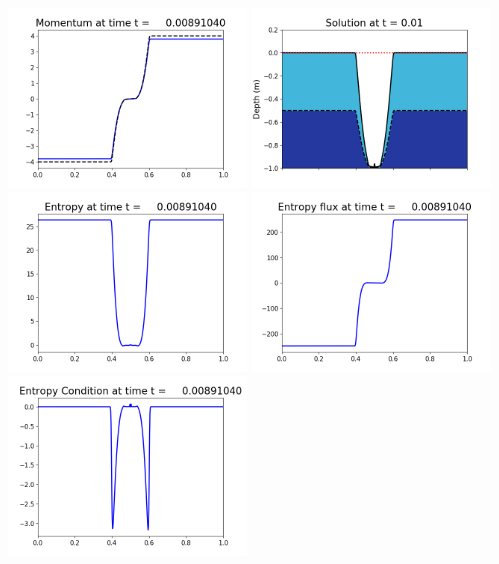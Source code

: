\documentclass[11pt]{article}
\begin{document}
\vskip 10pt 
\includegraphics[width=0.475\textwidth]{frame0056fig1003.png}
\includegraphics[width=0.475\textwidth]{frame0056fig1006.png}
\vskip 10pt 
\includegraphics[width=0.475\textwidth]{frame0056fig1007.png}
\includegraphics[width=0.475\textwidth]{frame0056fig1008.png}
\vskip 10pt 
\includegraphics[width=0.475\textwidth]{frame0056fig1009.png}
\end{document}
